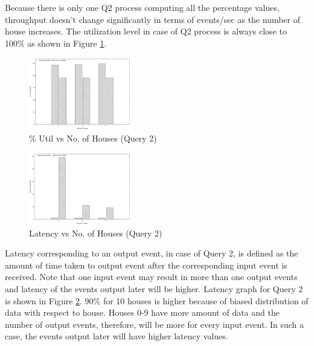 Because there is only one Q2 process computing all the percentage values, throughput doesn't change significantly in terms of events/sec as the number of house increases.
The utilization level in case of Q2 process is always close to 100\% as shown in Figure \ref{fig:q2_util}.

\begin{figure}[h]
\begin{center}
	\includegraphics[width=0.4\textwidth]{img/q2_utilization}
	\vspace*{-0.3cm}
	\caption{\% Util vs No.
of Houses (Query 2) \label{fig:q2_util}}
\end{center}
\end{figure}


\begin{figure}[h]
\begin{center}
	\includegraphics[width=0.4\textwidth]{img/q2_latency}
	\vspace*{-0.3cm}
	\caption{Latency vs No.
of Houses (Query 2) \label{fig:q2_latency}}
\end{center}
\end{figure}

Latency corresponding to an output event, in case of Query 2, is defined as the amount of time taken to output event after the corresponding input event is received.
Note that one input event may result in more than one output events and latency of the events output later will be higher.
Latency graph for Query 2 is shown in Figure \ref{fig:q2_latency}.
90\% for 10 houses is higher because of biased distribution of data with respect to house.
Houses 0-9 have more amount of data and the number of output events, therefore, will be more for every input event.
In such a case, the events output later will have higher latency values.

